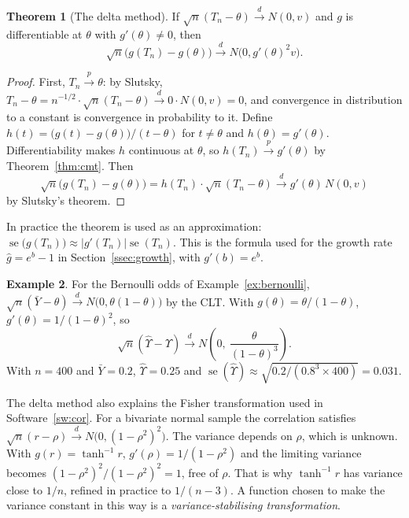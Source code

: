 \documentclass[11pt,a4paper]{article}
\numberwithin{equation}{section}
\theoremstyle{definition}
\newtheorem{thm}{Theorem}[subsection]
\newtheorem{exa}[thm]{Example}
\begin{document}
\begin{thm}[The delta method]
\label{thm:delta}
If $\sqrt n(T_n - \theta) \xrightarrow{d} N(0, v)$ and $g$ is differentiable at $\theta$ with $g'(\theta) \neq 0$, then
\[
\sqrt n\bigl(g(T_n) - g(\theta)\bigr) \xrightarrow{d} N\bigl(0, g'(\theta)^2v\bigr) .
\]
\end{thm}

\begin{proof}
First, $T_n \xrightarrow{p} \theta$: by Slutsky, $T_n - \theta = n^{-1/2}\cdot\sqrt n(T_n - \theta) \xrightarrow{d} 0 \cdot N(0, v) = 0$, and convergence in
distribution to a constant is convergence in probability to it. Define $h(t) = \bigl(g(t) - g(\theta)\bigr)/(t - \theta)$ for $t \neq \theta$ and
$h(\theta) = g'(\theta)$. Differentiability makes $h$ continuous at $\theta$, so $h(T_n) \xrightarrow{p} g'(\theta)$ by Theorem~\ref{thm:cmt}. Then
\[
\sqrt n\bigl(g(T_n) - g(\theta)\bigr) = h(T_n)\cdot\sqrt n(T_n - \theta) \xrightarrow{d} g'(\theta)\,N(0, v)
\]
by Slutsky's theorem.
\end{proof}

In practice the theorem is used as an approximation:
$\operatorname{se}\bigl(g(T_n)\bigr) \approx |g'(T_n)|\operatorname{se}(T_n)$. This is the formula used for the growth rate $\hat g = e^b - 1$ in
Section~\ref{ssec:growth}, with $g'(b) = e^b$.

\begin{exa}
\label{ex:oddsdelta}
For the Bernoulli odds of Example~\ref{ex:bernoulli}, $\sqrt n(\bar Y - \theta) \xrightarrow{d} N\bigl(0, \theta(1 - \theta)\bigr)$ by the CLT. With
$g(\theta) = \theta/(1 - \theta)$, $g'(\theta) = 1/(1 - \theta)^2$, so
\[
\sqrt n(\hat\Upsilon - \Upsilon) \xrightarrow{d} N\left(0,\ \frac{\theta}{(1 - \theta)^3}\right) .
\]
With $n = 400$ and $\bar Y = 0.2$, $\hat\Upsilon = 0.25$ and $\operatorname{se}(\hat\Upsilon) \approx \sqrt{0.2/(0.8^3 \times 400)} = 0.031$.

The delta method also explains the Fisher transformation used in Software~\ref{sw:cor}. For a bivariate normal sample the correlation satisfies
$\sqrt n(r - \rho) \xrightarrow{d} N\bigl(0, (1 - \rho^2)^2\bigr)$. The variance depends on $\rho$, which is unknown. With $g(r) = \tanh^{-1}r$,
$g'(\rho) = 1/(1 - \rho^2)$ and the limiting variance becomes $(1 - \rho^2)^2/(1 - \rho^2)^2 = 1$, free of $\rho$. That is why $\tanh^{-1}r$ has variance
close to $1/n$, refined in practice to $1/(n - 3)$. A function chosen to make the variance constant in this way is a \emph{variance-stabilising
transformation}.
\end{exa}
\end{document}
